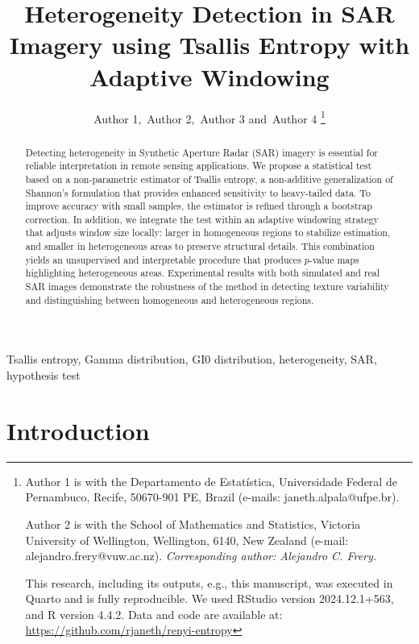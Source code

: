 \documentclass[
  lettersize  journal,
]{IEEEtran}%
\title{Heterogeneity Detection in SAR Imagery using Tsallis Entropy with
Adaptive Windowing}
\author{
Author 1\orcidlink{0000-0002-0265-6236},~Author
2\orcidlink{0000-0000},~Author 3\orcidlink{0000-0003-2673-219X}
and~Author 4\orcidlink{0000-0002-8002-5341}%
\thanks{Author 1 is with the Departamento de Estatística, Universidade
Federal de Pernambuco, Recife, 50670-901 PE, Brazil (e-mails:
janeth.alpala@ufpe.br).

Author 2 is with the School of Mathematics and Statistics, Victoria
University of Wellington, Wellington, 6140, New Zealand (e-mail:
alejandro.frery@vuw.ac.nz).
\emph{Corresponding author: Alejandro C. Frery.}

This research, including its outputs, e.g., this manuscript, was
executed in Quarto and is fully reproducible. We used RStudio version
2024.12.1+563, and R version 4.4.2. Data and code are available at:
\url{https://github.com/rjaneth/renyi-entropy}}
}
\renewcommand*\tablename{Table}
\newcommand\tablename{Table}
\begin{document}


\maketitle

\begin{abstract}
Detecting heterogeneity in Synthetic Aperture Radar (SAR) imagery is
essential for reliable interpretation in remote sensing applications. We
propose a statistical test based on a non-parametric estimator of
Tsallis entropy, a non-additive generalization of Shannon's formulation
that provides enhanced sensitivity to heavy-tailed data. To improve
accuracy with small samples, the estimator is refined through a
bootstrap correction. In addition, we integrate the test within an
adaptive windowing strategy that adjusts window size locally: larger in
homogeneous regions to stabilize estimation, and smaller in
heterogeneous areas to preserve structural details. This combination
yields an unsupervised and interpretable procedure that produces
\(p\)-value maps highlighting heterogeneous areas. Experimental results
with both simulated and real SAR images demonstrate the robustness of
the method in detecting texture variability and distinguishing between
homogeneous and heterogeneous regions.
\end{abstract}
\begin{IEEEkeywords}
Tsallis entropy, Gamma distribution, GI0
distribution, heterogeneity, SAR, hypothesis test
\end{IEEEkeywords}

%


\renewcommand{\tablename}{TABLE}

\section{Introduction}\label{introduction}
\end{document}
